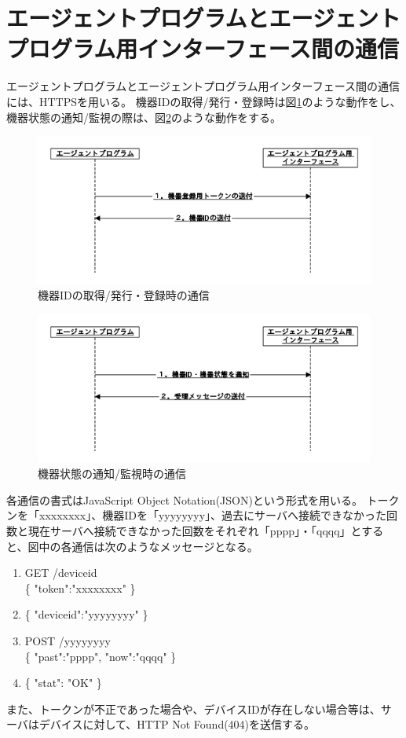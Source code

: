 \section{エージェントプログラムとエージェントプログラム用インターフェース間の通信}
エージェントプログラムとエージェントプログラム用インターフェース間の通信には、HTTPSを用いる。
機器IDの取得/発行・登録時は図\ref{fig:inter_program_regist}のような動作をし、機器状態の通知/監視の際は、図\ref{fig:inter_program_monit}のような動作をする。
\begin{figure}[htbp]
\includegraphics[width=16cm]{images/inter_program_regist.png}
\caption{機器IDの取得/発行・登録時の通信}
\label{fig:inter_program_regist}
\end{figure}
\begin{figure}[htbp]
\includegraphics[width=16cm]{images/inter_program_monit.png}
\caption{機器状態の通知/監視時の通信}
\label{fig:inter_program_monit}
\end{figure}

各通信の書式はJavaScript Object Notation(JSON)という形式を用いる。
トークンを「xxxxxxxx」、機器IDを「yyyyyyyy」、過去にサーバへ接続できなかった回数と現在サーバへ接続できなかった回数をそれぞれ「pppp」・「qqqq」とすると、図中の各通信は次のようなメッセージとなる。
\begin{enumerate}
\item GET /deviceid\\
	\{ "token":"xxxxxxxx" \}
\item \{ "deviceid":"yyyyyyyy" \}
\item POST /yyyyyyyy\\
	\{ "past":"pppp", "now":"qqqq" \}
\item \{ "stat": "OK" \}
\end{enumerate}
また、トークンが不正であった場合や、デバイスIDが存在しない場合等は、サーバはデバイスに対して、HTTP Not Found(404)を送信する。


